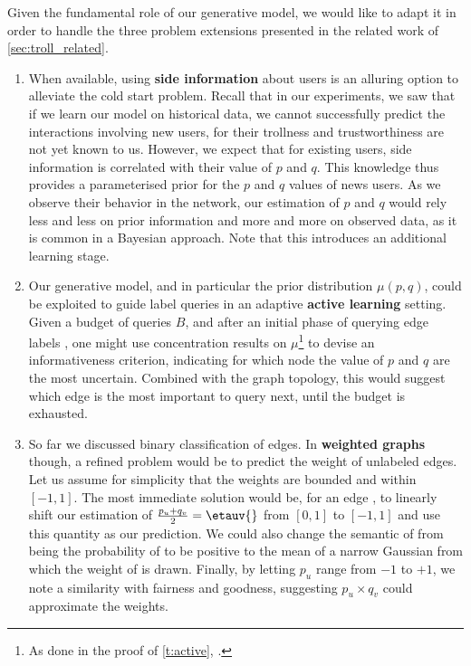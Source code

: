 \begin{newcontent}
\bigskip

Given the fundamental role of our generative model, we would like to adapt it in order to handle
the three problem extensions presented in the related work of \autoref{sec:troll_related}.

\begin{enumerate}[1.,]

  \item When available, using \textbf{side information} about users is an alluring option to
    alleviate the cold start problem. Recall that in our experiments, we saw that if we learn our
    model on historical data, we cannot successfully predict the interactions involving new users,
    for their trollness and trustworthiness are not yet known to us. However, we expect that for
    existing users, side information is correlated with their value of $p$ and $q$. This knowledge
    thus provides a parameterised prior for the $p$ and $q$ values of news users. As we observe
    their behavior in the network, our estimation of $p$ and $q$ would rely less and less on prior
    information and more and more on observed data, as it is common in a Bayesian approach. Note
    that this introduces an additional learning stage.

  \item Our generative model, and in particular the prior distribution $\mu(p,q)$, could be
    exploited to guide label queries in an adaptive \textbf{active learning} setting. Given a budget
    of queries $B$, and after an initial phase of querying edge labels \uar{}, one might use
    concentration results on $\mu$\footnote{As done in the proof of \autoref{t:active},
    .} to devise an informativeness criterion, indicating for which
    node the value of $p$ and $q$ are the most uncertain. Combined with the graph topology, this
    would suggest which edge is the most important to query next, until the budget is exhausted.

  \item So far we discussed binary classification of edges. In \textbf{weighted graphs} though, a
    refined problem would be to predict the weight of unlabeled edges. Let us assume for simplicity
    that the weights are bounded and within $[-1, 1]$. The most immediate solution would be, for an
    edge \euv{}, to linearly shift our estimation of $\frac{p_u+q_v}{2}=\etauv{}$ from $[0,1]$ to
    $[-1,1]$ and use this quantity as our prediction. We could also change the semantic of \etauv{}
    from being the probability of \euv{} to be positive to the mean of a narrow Gaussian from which
    the weight of \euv{} is drawn. Finally, by letting $p_u$ range from $-1$ to $+1$, we note a
    similarity with fairness and goodness, suggesting $p_u\times q_v$ could approximate the weights.
\end{enumerate}
\end{newcontent}
